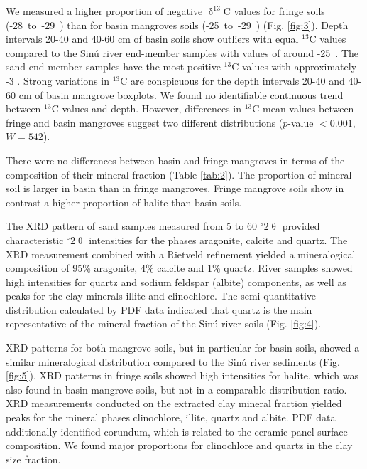 We measured a higher proportion of negative $\updelta^{13}$C values for fringe soils \mbox{(-28 to -29 \permil)} than for basin mangroves soils \mbox{(-25 to -29 \permil)} (Fig. \ref{fig:3}).  Depth intervals 20-40 and 40-60 cm of basin soils show outliers with equal $^{13}$C values compared to the Sin\'{u} river end-member samples with values of around \mbox{-25 \permil}. The sand end-member samples have the most positive $^{13}$C values with approximately -3 \permil.  Strong variations in $^{13}$C are conspicuous for the depth intervals 20-40 and 40-60 cm of basin mangrove boxplots. We found no identifiable continuous trend between $^{13}$C values and depth. However, differences in $^{13}$C mean values between fringe and basin mangroves suggest two different distributions ($p$-value $< 0.001$, $W = 542$). 


There were no differences between basin and fringe mangroves in terms of the composition of their mineral fraction (Table \ref{tab:2}). The proportion of mineral soil is larger in basin than in fringe mangroves. Fringe mangrove soils show in contrast a higher proportion of halite than basin soils.

The XRD pattern of sand samples measured from 5 to 60 $^{\circ}2\uptheta$ provided characteristic $^{\circ}2\uptheta$ intensities for the phases aragonite, calcite and quartz. The XRD measurement combined with a Rietveld refinement yielded a mineralogical composition of 95\% aragonite, 4\% calcite and 1\% quartz.
River samples showed high intensities for quartz and sodium feldspar (albite) components, as well as peaks for the clay minerals illite and clinochlore. The semi-quantitative distribution calculated by PDF data indicated that quartz is the main representative of the mineral fraction of the Sin\'{u} river soils (Fig. \ref{fig:4}).

XRD patterns for both mangrove soils, but in particular for basin soils, showed a similar mineralogical distribution compared to the Sin\'{u} river sediments (Fig. \ref{fig:5}). XRD patterns in fringe soils showed high intensities for halite, which was also found in basin mangrove soils, but not in a comparable distribution ratio.
XRD measurements conducted on the extracted clay mineral fraction yielded peaks for the mineral phases clinochlore, illite, quartz and albite. PDF data additionally identified corundum, which is related to the ceramic panel surface composition. We found major proportions for clinochlore and quartz in the clay size fraction. 

